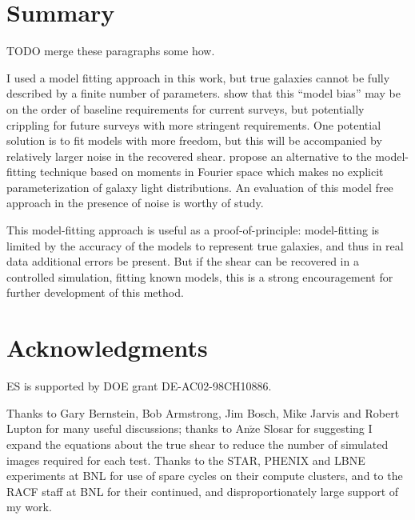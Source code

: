 \documentclass[12pt,preprint]{aastex}
\begin{document}
\section{Summary} \label{sec:summary}

TODO merge these paragraphs some how.

I used a model fitting approach in this work, but true galaxies cannot be fully
described by a finite number of parameters.  \cite{Kacprzak13} show that this
``model bias'' may be on the order of baseline requirements for current
surveys, but potentially crippling for future surveys with more stringent
requirements. One potential solution is to fit models with more freedom, but
this will be accompanied by relatively larger noise in the recovered shear.
\cite{ba14} propose an alternative to the model-fitting technique based on
moments in Fourier space which makes no explicit parameterization of galaxy
light distributions.  An evaluation of this model free approach in the presence
of noise is worthy of study.

This model-fitting approach is useful as a proof-of-principle:  model-fitting
is limited by the accuracy of the models to represent true galaxies, and thus
in real data additional errors be present.  But if the shear can be recovered
in a controlled simulation, fitting known models, this is a strong
encouragement for further development of this method.


\section*{Acknowledgments}

ES is supported by DOE grant DE-AC02-98CH10886.

Thanks to Gary Bernstein, Bob Armstrong, Jim Bosch, Mike Jarvis and Robert
Lupton for many useful discussions; thanks to An$\check{\textrm{z}}$e Slosar for
suggesting I expand the equations about the true shear to reduce the number of
simulated images required for each test.  Thanks to the STAR, PHENIX and LBNE
experiments at BNL for use of spare cycles on their compute clusters, and to
the RACF staff at BNL for their continued, and disproportionately large support
of my work.




\end{document}
